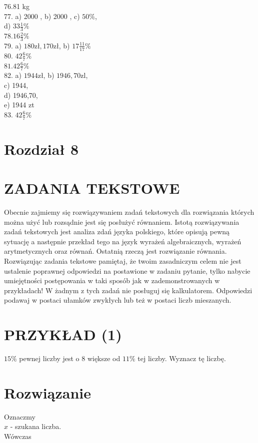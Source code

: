 \documentclass[10pt]{article}
\begin{document}
76.81 kg\\
77. a) 2000 , b) 2000 , c) \(50 \%\),\\
d) \(33 \frac{1}{3} \%\)\\
\(78.16 \frac{2}{3} \%\)\\
79. a) \(180 \mathrm{zł}, 170 \mathrm{zł}\), b) \(17 \frac{11}{17} \%\)\\
80. \(42 \frac{6}{7} \%\)\\
\(81.42 \frac{6}{7} \%\)\\
82. a) \(1944 \mathrm{zł}\), b) \(1946,70 \mathrm{zl}\),\\
c) 1944,\\
d) 1946,70,\\
e) 1944 zt\\
83. \(42 \frac{6}{7} \%\)

\section*{Rozdział 8}
\section*{ZADANIA TEKSTOWE}
Obecnie zajmiemy się rozwiązywaniem zadań tekstowych dla rozwiązania których można użyć lub rozsądnie jest się posłużyć równaniem. Istotą rozwiązywania zadań tekstowych jest analiza zdań języka polskiego, które opisują pewną sytuację a następnie przekład tego na język wyrażeń algebraicznych, wyrażeń arytmetycznych oraz równań. Ostatnią rzeczą jest rozwiązanie równania. Rozwiązując zadania tekstowe pamiętaj, że twoim zasadniczym celem nie jest ustalenie poprawnej odpowiedzi na postawione w zadaniu pytanie, tylko nabycie umiejętności postępowania w taki sposób jak w zademonstrowanych w przykładach! W żadnym z tych zadań nie posługuj się kalkulatorem. Odpowiedzi podawaj w postaci ułamków zwykłych lub też w postaci liczb mieszanych.

\section*{PRZYKŁAD (1)}
\(15 \%\) pewnej liczby jest o 8 większe od \(11 \%\) tej liczby. Wyznacz tę liczbę.

\section*{Rozwiązanie}
Oznaczmy\\
\(x\) - szukana liczba.\\
Wówczas
\end{document}

